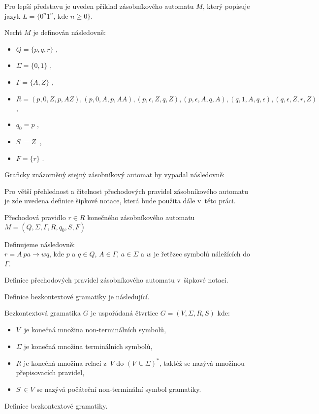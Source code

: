Pro lepší představu je uveden příklad zásobníkového automatu \(M\), který popisuje jazyk \( L = \{ 0^n 1^n \text{, kde } n \geq 0 \} \).

Nechť \(M\) je definován následovně:  
\begin{itemize}
	\item \( Q = \{ p, q, r\} \) ,
	\item \( \Sigma = \{0, 1\} \) ,
	\item \( \Gamma =  \{A, Z\}\) ,
	\item \( R = (p, 0, Z, p, AZ) , (p,0,A,p,AA), (p,\epsilon,Z,q,Z), (p,\epsilon,A,q,A), (q,1,A,q,\epsilon), (q,\epsilon,Z,r,Z) \),
	\item \( q_0 = p\) ,
	\item \( S~= Z~\) ,
	\item \( F = \{r\} \) .
\end{itemize}

Graficky znázorněný stejný zásobníkový automat by vypadal následovně:



Pro větší přehlednost a čitelnost přechodových pravidel zásobníkového automatu je zde uvedena definice šipkové notace, která bude použita dále v~této práci.

\begin{framed}
	\begin{flushleft}Přechodová pravidlo $r \in R$ konečného zásobníkového automatu \( M = (Q, \Sigma, \Gamma, R, q_0, S, F) \)\end{flushleft} 
	Definujeme následovně: \\
	\( r = A~p a \rightarrow w q \), kde $p$ a $ q \in Q$, $A \in \Gamma$, $a \in \Sigma$ a $w$ je řetězec symbolů náležících do $\Gamma$.
\end{framed}
\begin{mydef}
	Definice přechodových pravidel zásobníkového automatu v~šipkové notaci.
\end{mydef}


Definice bezkontextové gramatiky je následující. \cite{CFG}

\begin{framed}
	Bezkontextová gramatika \( G \) je uspořádaná čtvrtice \( G = (V, \Sigma, R, S) \) kde:
	\begin{itemize}
		\item \( V~\) je konečná množina non-terminálních symbolů,
		\item \( \Sigma \) je konečná množina terminálních symbolů,
		\item \( R \) je konečná množina relací z~\(V\) do \( (V~\cup \Sigma )^* \), taktéž se nazývá množinou přepisovacích pravidel,
		\item \( S~\in V\) se nazývá počáteční non-terminální symbol gramatiky.
	\end{itemize}
\end{framed}
\begin{mydef}
	Definice bezkontextové gramatiky.
\end{mydef}


